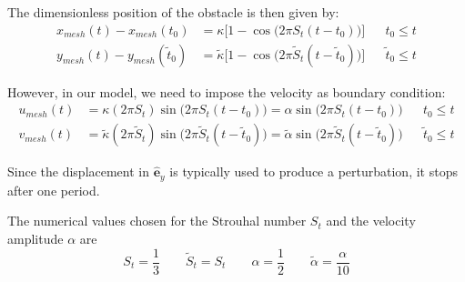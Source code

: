 \documentclass[11 pt]{article}
\begin{document}
The dimensionless position of the obstacle is then given by:
\begin{equation}
\begin{aligned}
    x_{mesh}(t) - x_{mesh}(t_0) &= \kappa \Big[1 - \cos{\Big(2\pi S_t (t - t_0)\Big)} \Big] && t_0 \leq t\\
    y_{mesh}(t) - y_{mesh}(\tilde t_0) &= \tilde \kappa \Big[1 - \cos{\Big(2\pi \tilde S_t (t - \tilde t_0)\Big)} \Big] && \tilde t_0 \leq t
\end{aligned}
\end{equation}

However, in our model, we need to impose the velocity as boundary condition:
\begin{equation}
\begin{aligned}
    u_{mesh}(t) &= \kappa (2\pi S_t) \sin{\big(2\pi S_t (t - t_0)\big)} = \alpha \sin{\big(2\pi S_t (t - t_0)\big)} && t_0 \leq t\\
    v_{mesh}(t) &= \tilde \kappa (2\pi \tilde S_t ) \sin{\big(2\pi \tilde S_t (t - \tilde t_0)\big)} = \tilde \alpha \sin{\big(2\pi \tilde S_t (t - \tilde t_0)\big)} && \tilde t_0 \leq t
\end{aligned}
\end{equation}

Since the displacement in $\mathbf{\hat e}_y$ is typically used to produce a perturbation, it stops after one period. 

The numerical values chosen for the Strouhal number $S_t$ and the velocity amplitude $\alpha$ are
\begin{equation}
    S_t = \frac{1}{3} \qquad \tilde S_t = S_t \qquad \alpha = \frac{1}{2} \qquad \tilde \alpha = \frac{\alpha}{10}
\end{equation}
\end{document}
